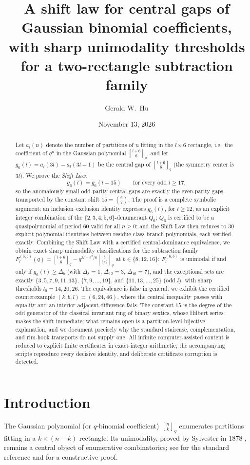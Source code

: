 \documentclass[11pt,reqno]{article}
\title{\bf A shift law for central gaps of Gaussian binomial coefficients,\\ with sharp unimodality thresholds for a two-rectangle subtraction family}
\author{Gerald W.\ Hu}
\date{November 13, 2026}
\theoremstyle{definition}
\newcommand{\ggbrack}[2]{\genfrac{[}{]}{0pt}{}{#1}{#2}_q}
\begin{document}
\maketitle

\begin{abstract}
Let $a_l(n)$ denote the number of partitions of $n$ fitting in the $l\times 6$ rectangle, i.e.\ the coefficient of $q^n$ in the Gaussian polynomial $\ggbrack{l+6}{6}$, and let $g_6(l)=a_l(3l)-a_l(3l-1)$ be the central gap of $\ggbrack{l+6}{6}$ (the symmetry center is $3l$). We prove the \emph{Shift Law}:
\[
g_6(l)=g_6(l-15)\qquad\text{for every odd } l\ge 17,
\]
so the anomalously small odd-parity central gaps are exactly the even-parity gaps transported by the constant shift $15=\binom{6}{2}$. The proof is a complete symbolic argument: an inclusion--exclusion identity expresses $g_6(l)$, for $l\ge 12$, as an explicit integer combination of the $\{2,3,4,5,6\}$-denumerant $Q_6$; $Q_6$ is certified to be a quasipolynomial of period $60$ valid for all $n\ge0$; and the Shift Law then reduces to $30$ explicit polynomial identities between residue-class branch polynomials, each verified exactly. Combining the Shift Law with a certified central-dominance equivalence, we obtain exact sharp unimodality classifications for the subtraction family $F^{(6,b)}_l(q)=\ggbrack{l+6}{6}-q^{3l-b^2/8}\ggbrack{b}{b/2}$ at $b\in\{8,12,16\}$: $F^{(6,b)}_l$ is unimodal if and only if $g_6(l)\ge\Delta_b$ (with $\Delta_8=1$, $\Delta_{12}=3$, $\Delta_{16}=7$), and the exceptional sets are exactly $\{3,5,7,9,11,13\}$, $\{7,9,\dots,19\}$, and $\{11,13,\dots,25\}$ (odd $l$), with sharp thresholds $l_0=14,20,26$. The equivalence is false in general: we exhibit the certified counterexample $(k,b,l)=(6,24,46)$, where the central inequality passes with equality and an interior adjacent difference fails. The constant $15$ is the degree of the odd generator of the classical invariant ring of binary sextics, whose Hilbert series makes the shift immediate; what remains open is a partition-level bijective explanation, and we document precisely why the standard staircase, complementation, and rim-hook transports do not supply one. All infinite computer-assisted content is reduced to explicit finite certificates in exact integer arithmetic; the accompanying scripts reproduce every decisive identity, and deliberate certificate corruption is detected.
\end{abstract}

\section{Introduction}\label{sec:intro}
The Gaussian polynomial (or $q$-binomial coefficient) $\ggbrack{n}{k}$ enumerates partitions fitting in a $k\times(n-k)$ rectangle. Its unimodality, proved by Sylvester in 1878 \cite{sylvester}, remains a central object of enumerative combinatorics; see \cite{stanley} for the standard reference and \cite{ohara} for a constructive proof.
\end{document}
